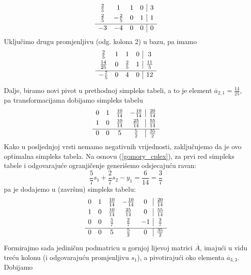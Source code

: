 \documentclass[a4paper, utf8, 11pt, colorlinks]{book}
\theoremstyle{definition}
\begin{document}
$$\begin{array}{cccc|c}\vspace{1mm}
   \frac{2}{5}           & 1               & 1 & 0 & 3 \\\vspace{1mm}
   \frac{2}{5}           & -\frac{2}{5}    & 0 & 1 & 1 \\ \hline
   -3                    &  -4             & 0 & 0 & 0
\end{array}$$
Uključimo drugu promjenljivu (odg. kolona 2) u bazu, pa imamo 
$$\begin{array}{cccc|c}\vspace{1mm}
   \frac{2}{5}           & 1               & 1           & 0 & 3 \\\vspace{1mm}
   \frac{14}{25}         & 0    & \frac{2}{5} & 1&\frac{11}{5}\\\hline\vspace{1mm}
   -\frac{7}{5}     & 0     &4 & 0 & 12
\end{array}$$
Dalje, biramo novi pivot  u prethodnoj simpleks tabeli, a to je element $\overline{a}_{2,1} = \frac{14}{25}$, pa transformacijama dobijamo simpleks tabelu
$$
\begin{array}{cccc|c}\vspace{1mm}
    0    &  1  &  \frac{10}{14} &  -\frac{10}{14}  &  \frac{20}{14}  \\\vspace{1mm}
    1    &  0  &  \frac{10}{14} &   \frac{25}{14}  &   \frac{55}{14}\\ \hline
    0    &  0  &  5             &    \frac{5}{2}   &    \frac{35}{2}
\end{array}
$$
Kako u posljednjoj vrsti nemamo negativnih vrijednosti, zaključujemo da je ovo optimalna simpleks tabela. Na osnovu (\ref{gomory_cplex}),   za prvi red simpleks tabele i odgovarajuće ogranjičenje generišemo odsjecajuću ravan:
$$   \frac{5}{7}s_1 + \frac{2}{7} s_2 -      y_1   = \frac{6}{14}=\frac{3}{7}$$
pa je dodajemo u (završnu) simpleks tabelu:
$$
\begin{array}{ccccc|c}\vspace{1mm}
    0    &  1  &  \frac{10}{14} &  -\frac{10}{14}  &  0 & \frac{20}{14} \\\vspace{1mm}
    1    &  0  &  \frac{10}{14} &   \frac{25}{14}  &  0 & \frac{55}{14}\\ \vspace{1mm}
    0    &  0  & \frac{5}{7}    &   \frac{2}{7}    &  -1 & \frac{3}{7}  \\\hline \vspace{1mm}
    0    &  0  &  5             &    \frac{5}{2}   &  0 &    \frac{35}{2}
\end{array}
$$
Formirajmo sada jediničnu podmatricu u gornjoj lijevoj matrici $\overline{A}$, imajući u vidu treću kolonu (i odgovarajuću promjenljivu $s_1$), a pivotirajući oko elementa $\overline{a}_{3,3}$. Dobijamo 
\end{document}
